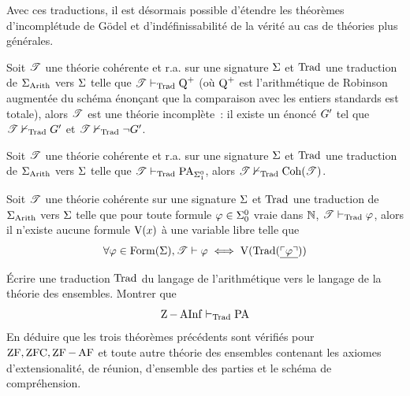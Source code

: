 Avec ces traductions, il est désormais possible d'étendre les théorèmes
d'incomplétude de Gödel et d'indéfinissabilité de la vérité au cas de
théories plus générales.

\begin{theorem}\label{thm.Godel1.ZFC}
  Soit $\mathscr T$ une théorie cohérente et r.a. sur une signature $\Sigma$ et
  $\operatorname{Trad}$ une traduction de $\Sigma_{\operatorname{Arith}}$ vers $\Sigma$ telle que
  $\mathscr T\vdash_{\operatorname{Trad}} \operatorname{Q}^+$ (où $\operatorname{Q}^+$ est l'arithmétique
  de Robinson augmentée du schéma énonçant que la comparaison avec les
  entiers standards est totale), alors $\mathscr T$ est une théorie incomplète~:
  il existe un énoncé $G'$ tel que
  $\mathscr T \nvdash_{\operatorname{Trad}} G'$ et $\mathscr T\nvdash_{\operatorname{Trad}} \lnot G'$.
\end{theorem}

\begin{theorem}\label{thm.Godel2.ZFC}
  Soit $\mathscr T$ une théorie cohérente et r.a. sur une signature $\Sigma$ et
  $\operatorname{Trad}$ une traduction de $\Sigma_{\operatorname{Arith}}$ vers $\Sigma$ telle que
  $\mathscr T \vdash_{\operatorname{Trad}} \operatorname{PA}_{\Sigma^0_{1}}$, alors $\mathscr T\nvdash_{\operatorname{Trad}} \operatorname{Coh}(\mathscr T)$.
\end{theorem}

\begin{theorem}\label{thm.Tarski.ZFC}
  Soit $\mathscr T$ une théorie cohérente sur une signature $\Sigma$ et $\operatorname{Trad}$
  une traduction de $\Sigma_{\operatorname{Arith}}$ vers $\Sigma$ telle que pour toute
  formule $\varphi\in\Sigma^0_{0}$ vraie dans $\mathbb N$,
  $\mathscr T\vdash_{\operatorname{Trad}}\varphi$, alors il n'existe aucune formule $\mathrm{V}(x)$ à une
  variable libre telle que
  \[\forall \varphi \in \operatorname{Form}(\Sigma),
  \mathscr T\vdash \varphi \iff \mathrm{V}(\operatorname{Trad}(\underline{\ulcorner\varphi\urcorner}))\]
\end{theorem}

\begin{exercise}
  \'Ecrire une traduction $\operatorname{Trad}$ du langage de l'arithmétique vers le
  langage de la théorie des ensembles. Montrer que
  \[\operatorname{Z} - \operatorname{AInf} \vdash_{\operatorname{Trad}} \operatorname{PA}\]
  En déduire que les trois théorèmes précédents sont vérifiés pour
  $\operatorname{ZF}, \operatorname{ZFC}, \operatorname{ZF} - \operatorname{AF}$ et toute autre théorie des ensembles contenant les
  axiomes d'extensionalité, de réunion, d'ensemble des parties et le schéma de
  compréhension.
\end{exercise}

